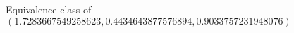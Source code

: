 \documentclass[preview]{standalone}
\begin{document}
\begin{center}
Equivalence class of $(1.7283667549258623, 0.4434643877576894, 0.9033757231948076)$
\end{center}
\end{document}
